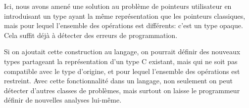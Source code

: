 Ici, nous avons amené une solution au problème de pointeurs utilisateur en
introduisant un type ayant la même représentation que les pointeurs classiques,
mais pour lequel l'ensemble des opérations est différents: c'est un type opaque.
Cela suffit déjà à détecter des erreurs de programmation.

Si on ajoutait cette construction au langage, on pourrait définir des nouveaux
types partageant la représentation d'un type C existant, mais qui ne soit pas
compatible avec le type d'origine, et pour lequel l'ensemble des opérations est
restreint. Avec cette fonctionnalité dans un langage, non seulement on peut
détecter d'autres classes de problèmes, mais surtout on laisse le programmeur
définir de nouvelles analyses lui-même.


